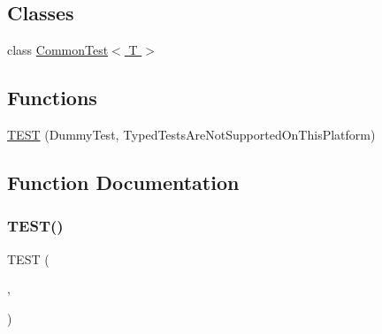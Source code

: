 \subsection*{Classes}
\begin{DoxyCompactItemize}
\item 
class \hyperlink{class_common_test}{Common\+Test$<$ T $>$}
\end{DoxyCompactItemize}
\subsection*{Functions}
\begin{DoxyCompactItemize}
\item 
\hyperlink{gtest-typed-test__test_8cc_a7d2c906b58ca05100fcea4e00858d2c6}{T\+E\+ST} (Dummy\+Test, Typed\+Tests\+Are\+Not\+Supported\+On\+This\+Platform)
\end{DoxyCompactItemize}


\subsection{Function Documentation}
\mbox{\label{gtest-typed-test__test_8cc_a7d2c906b58ca05100fcea4e00858d2c6}} 
\subsubsection{\texorpdfstring{T\+E\+S\+T()}{TEST()}}
{\footnotesize\ttfamily T\+E\+ST (\begin{DoxyParamCaption}\item[{Dummy\+Test}]{,  }\item[{Typed\+Tests\+Are\+Not\+Supported\+On\+This\+Platform}]{ }\end{DoxyParamCaption})}

